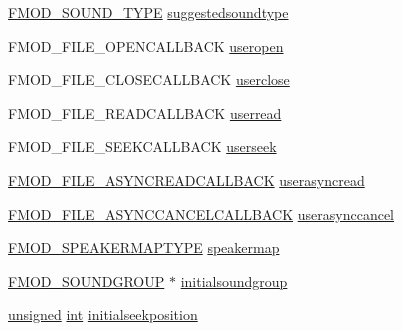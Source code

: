 \begin{DoxyCompactItemize}
\hyperlink{fmod_8h_a83dd87ce05a7a42ebab64a9230d50773}{F\-M\-O\-D\-\_\-\-S\-O\-U\-N\-D\-\_\-\-T\-Y\-P\-E} \hyperlink{struct_f_m_o_d___c_r_e_a_t_e_s_o_u_n_d_e_x_i_n_f_o_a48b58dbbb8f89152cb60ac081e667849}{suggestedsoundtype}
\item 
F\-M\-O\-D\-\_\-\-F\-I\-L\-E\-\_\-\-O\-P\-E\-N\-C\-A\-L\-L\-B\-A\-C\-K \hyperlink{struct_f_m_o_d___c_r_e_a_t_e_s_o_u_n_d_e_x_i_n_f_o_a44563654ebe147baa782611c6f7fa42f}{useropen}
\item 
F\-M\-O\-D\-\_\-\-F\-I\-L\-E\-\_\-\-C\-L\-O\-S\-E\-C\-A\-L\-L\-B\-A\-C\-K \hyperlink{struct_f_m_o_d___c_r_e_a_t_e_s_o_u_n_d_e_x_i_n_f_o_a0daf40f5565376da5748c00ccae724cf}{userclose}
\item 
F\-M\-O\-D\-\_\-\-F\-I\-L\-E\-\_\-\-R\-E\-A\-D\-C\-A\-L\-L\-B\-A\-C\-K \hyperlink{struct_f_m_o_d___c_r_e_a_t_e_s_o_u_n_d_e_x_i_n_f_o_af6e3697c3e76ec82028b5ed79daa084e}{userread}
\item 
F\-M\-O\-D\-\_\-\-F\-I\-L\-E\-\_\-\-S\-E\-E\-K\-C\-A\-L\-L\-B\-A\-C\-K \hyperlink{struct_f_m_o_d___c_r_e_a_t_e_s_o_u_n_d_e_x_i_n_f_o_a9063a97ac9de132f8ff2ba7048670e1c}{userseek}
\item 
\hyperlink{fmod_8h_a46af338d4692ce939b00d78e569b2f25}{F\-M\-O\-D\-\_\-\-F\-I\-L\-E\-\_\-\-A\-S\-Y\-N\-C\-R\-E\-A\-D\-C\-A\-L\-L\-B\-A\-C\-K} \hyperlink{struct_f_m_o_d___c_r_e_a_t_e_s_o_u_n_d_e_x_i_n_f_o_a4d0dd8153d5191e550b8a8ef6123d737}{userasyncread}
\item 
\hyperlink{fmod_8h_a3bd0b88cc82464de6af754334b88ae1e}{F\-M\-O\-D\-\_\-\-F\-I\-L\-E\-\_\-\-A\-S\-Y\-N\-C\-C\-A\-N\-C\-E\-L\-C\-A\-L\-L\-B\-A\-C\-K} \hyperlink{struct_f_m_o_d___c_r_e_a_t_e_s_o_u_n_d_e_x_i_n_f_o_a6cf94db240477e76107573b5e4f69ed8}{userasynccancel}
\item 
\hyperlink{fmod_8h_a57bd1c29720f8c774eabb3e69d8a6e4a}{F\-M\-O\-D\-\_\-\-S\-P\-E\-A\-K\-E\-R\-M\-A\-P\-T\-Y\-P\-E} \hyperlink{struct_f_m_o_d___c_r_e_a_t_e_s_o_u_n_d_e_x_i_n_f_o_a4a2100eaf35bb354cff5875811450006}{speakermap}
\item 
\hyperlink{fmod_8h_a06b2440958b1796013034da487fe15fa}{F\-M\-O\-D\-\_\-\-S\-O\-U\-N\-D\-G\-R\-O\-U\-P} $\ast$ \hyperlink{struct_f_m_o_d___c_r_e_a_t_e_s_o_u_n_d_e_x_i_n_f_o_a680f5786a4a73c4ce3efd244aab1aeba}{initialsoundgroup}
\item 
\hyperlink{_free_image_8h_a425076c7067a1b5166e2cc530e914814}{unsigned} \hyperlink{wglew_8h_a500a82aecba06f4550f6849b8099ca21}{int} \hyperlink{struct_f_m_o_d___c_r_e_a_t_e_s_o_u_n_d_e_x_i_n_f_o_abd2577182ac908d6af88d4610470e68c}{initialseekposition}
\item 

\end{DoxyCompactItemize}
